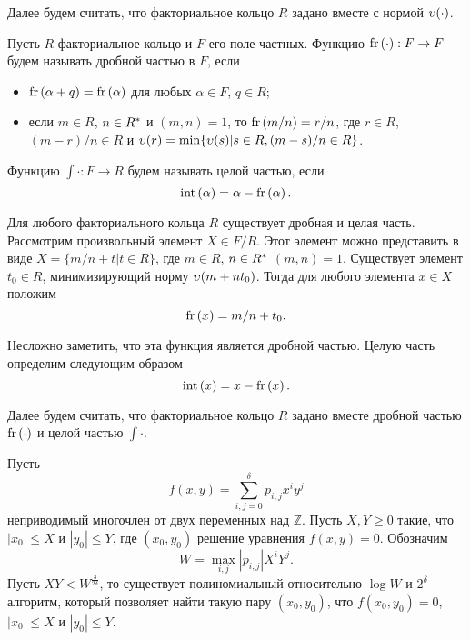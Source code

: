 \documentclass[_00_dissertation.tex]{subfiles}
\begin{document}
Далее будем считать, что факториальное кольцо $R$ задано вместе с нормой $\upsilon(\cdot)$.

\begin{definition}
    Пусть $R$ факториальное кольцо и $F$ его поле частных.
    Функцию $\textrm{fr}\left(\cdot\right): F \to F$ будем называть дробной частью в $F$, если
    \begin{itemize}
        \item $\textrm{fr}\left(\alpha + q\right) = \textrm{fr}\left(\alpha\right)$ для любых $\alpha \in F$, $q \in R$;

        \item если $m \in R$, $n \in R^{*}$ и $(m, n) = 1$, то $\textrm{fr}\left(m/n\right) = r/n$, где $r \in R$, $(m-r)/n \in R$ и $\upsilon(r) = \min \{\upsilon(s) | s \in R, (m-s)/n \in R\}$.
    \end{itemize}
    Функцию $\int{\cdot}: F \to R$ будем называть целой частью, если
    \begin{equation*}
        \textrm{int}\left(\alpha\right) = \alpha - \textrm{fr}\left(\alpha\right).
    \end{equation*}
\end{definition}

\begin{remark}\label{remark:easy_fr}
    Для любого факториального кольца $R$ существует дробная и целая часть.
    Рассмотрим произвольный элемент $X \in F/R$.
    Этот элемент можно представить в виде $X = \{m/n + t | t \in R\}$, где $m \in R$, $n \in R^{*}$ $(m, n) = 1$.
    Существует элемент $t_0 \in R$, минимизирующий норму $\upsilon(m + n t_0)$.
    Тогда для любого элемента $x \in X$ положим
    \begin{equation*}
        \textrm{fr}\left(x\right) = m/n + t_0.
    \end{equation*}

    Несложно заметить, что эта функция является дробной частью.
    Целую часть определим следующим образом
    \begin{equation*}
        \textrm{int}\left(x\right) = x - \textrm{fr}\left(x\right).
    \end{equation*}
\end{remark}

Далее будем считать, что факториальное кольцо $R$ задано вместе дробной частью $\textrm{fr}\left(\cdot\right)$ и целой частью $\int{\cdot}$.

\begin{statement}\label{statement:coppersmith}
  Пусть
  \begin{equation*}
      f(x, y) = \sum\limits_{i, j = 0}^{\delta} p_{i, j} x^i y^j
  \end{equation*}
  неприводимый многочлен от двух переменных над $\mathbb{Z}$.
  Пусть $X, Y \ge 0$ такие, что $|x_0| \le X$ и $|y_0| \le Y$, где $(x_0, y_0)$ решение уравнения $f(x, y) = 0$.
  Обозначим
  \begin{equation*}
      W = \max_{i, j} |p_{i, j}| X^i Y^j.
  \end{equation*}
  Пусть $XY < W^{\frac{3}{2\delta}}$, то существует полиномиальный относительно $\log W$ и $2^\delta$ алгоритм, который позволяет найти такую пару $(x_0, y_0)$, что $f(x_0, y_0) = 0$, $|x_0| \le X$ и $|y_0| \le Y$.
\end{statement}
\end{document}
